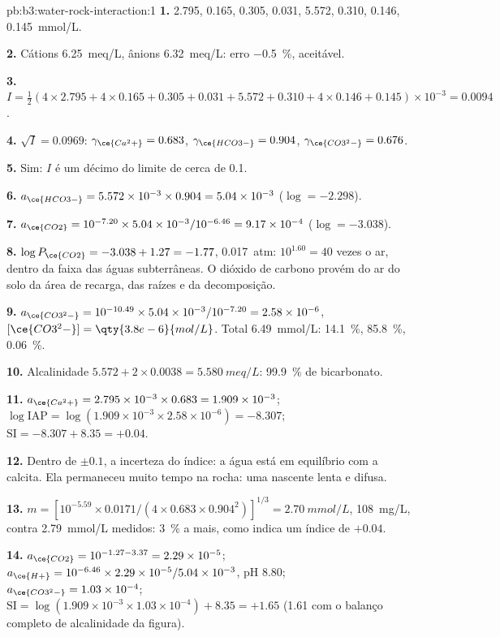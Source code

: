 \begin{solution}{pb:b3:water-rock-interaction:1}
\textbf{1.}  2.795,  0.165,  0.305,  0.031,
 5.572,  0.310,  0.146,  \qty{0.145}{mmol/L}.

\textbf{2.} Cátions \qty{6.25}{meq/L}, ânions \qty{6.32}{meq/L}: erro
\qty{-0.5}{\percent}, aceitável.

\textbf{3.} $I = \tfrac12(4\times2.795 + 4\times0.165 + 0.305 + 0.031 + 5.572
+ 0.310 + 4\times0.146 + 0.145)\times10^{-3} = 0.0094$.

\textbf{4.} $\sqrt I = 0.0969$: $\gamma_{\ce{Ca^2+}} = 0.683$,
$\gamma_{\ce{HCO3-}} = 0.904$, $\gamma_{\ce{CO3^2-}} = 0.676$.

\textbf{5.} Sim: $I$ é um décimo do limite de cerca de 0.1.

\textbf{6.} $a_{\ce{HCO3-}} = 5.572\times10^{-3}\times0.904 = 5.04\times
10^{-3}$ ($\log = -2.298$).

\textbf{7.} $a_{\ce{CO2}} = 10^{-7.20}\times5.04\times10^{-3}/10^{-6.46} =
9.17\times10^{-4}$ ($\log = -3.038$).

\textbf{8.} $\log P_{\ce{CO2}} = -3.038 + 1.27 = -1.77$, \qty{0.017}{atm}:
$10^{1.60} = 40$ vezes o ar, dentro da faixa das águas subterrâneas. O dióxido de carbono
provém do ar do solo da área de recarga, das raízes e da decomposição.

\textbf{9.} $a_{\ce{CO3^2-}} = 10^{-10.49}\times5.04\times10^{-3}/10^{-7.20}
= 2.58\times10^{-6}$, $[\ce{CO3^2-}] = \qty{3.8e-6}{mol/L}$. Total
\qty{6.49}{mmol/L}:  \qty{14.1}{\percent}, 
\qty{85.8}{\percent},  \qty{0.06}{\percent}.

\textbf{10.} Alcalinidade $5.572 + 2\times0.0038 = \qty{5.580}{meq/L}$:
\qty{99.9}{\percent} de bicarbonato.

\textbf{11.} $a_{\ce{Ca^2+}} = 2.795\times10^{-3}\times0.683 = 1.909\times
10^{-3}$; $\log\mathrm{IAP} = \log(1.909\times10^{-3}\times2.58\times10^{-6})
= -8.307$; $\mathrm{SI} = -8.307 + 8.35 = +0.04$.

\textbf{12.} Dentro de $\pm0.1$, a incerteza do índice: a água está em
equilíbrio com a calcita. Ela permaneceu muito tempo na rocha: uma nascente
lenta e difusa.

\textbf{13.} $m = [10^{-5.59}\times0.0171/(4\times0.683\times0.904^2)]^{1/3}
= \qty{2.70}{mmol/L}$, \qty{108}{mg/L}, contra \qty{2.79}{mmol/L} medidos:
\qty{3}{\percent} a mais, como indica um índice de $+0.04$.

\textbf{14.} $a_{\ce{CO2}} = 10^{-1.27 - 3.37} = 2.29\times10^{-5}$;
$a_{\ce{H+}} = 10^{-6.46}\times2.29\times10^{-5}/5.04\times10^{-3}$, pH 8.80;
$a_{\ce{CO3^2-}} = 1.03\times10^{-4}$; $\mathrm{SI} = \log(1.909\times
10^{-3}\times1.03\times10^{-4}) + 8.35 = +1.65$ (1.61 com o balanço
completo de alcalinidade da figura).


\end{solution}
